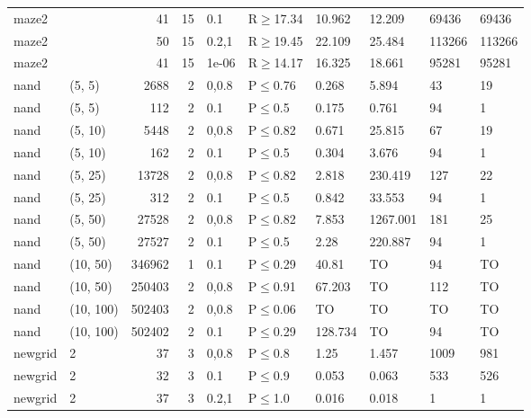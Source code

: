 \begin{longtable}{llrrllllll}
 maze2         &           &     	41 &   15 & 0.1   & R$\geq$17.34 & 10.962  & 12.209   & 69436  & 69436  \\
 maze2         &           &     	50 &   15 & 0.2,1 & R$\geq$19.45 & 22.109  & 25.484   & 113266 & 113266 \\
 maze2         &           &     	41 &   15 & 1e-06 & R$\geq$14.17 & 16.325  & 18.661   & 95281  & 95281  \\
 nand          & (5, 5)    &   	2688 &    2 & 0,0.8 & P$\leq$0.76  & 0.268   & 5.894    & 43     & 19     \\
 nand          & (5, 5)    &    	112 &    2 & 0.1   & P$\leq$0.5   & 0.175   & 0.761    & 94     & 1      \\
 nand          & (5, 10)   &   	5448 &    2 & 0,0.8 & P$\leq$0.82  & 0.671   & 25.815   & 67     & 19     \\
 nand          & (5, 10)   &    	162 &    2 & 0.1   & P$\leq$0.5   & 0.304   & 3.676    & 94     & 1      \\
 nand          & (5, 25)   &  	13728 &    2 & 0,0.8 & P$\leq$0.82  & 2.818   & 230.419  & 127    & 22     \\
 nand          & (5, 25)   &    	312 &    2 & 0.1   & P$\leq$0.5   & 0.842   & 33.553   & 94     & 1      \\
 nand          & (5, 50)   &  	27528 &    2 & 0,0.8 & P$\leq$0.82  & 7.853   & 1267.001 & 181    & 25     \\
 nand          & (5, 50)   &  	27527 &    2 & 0.1   & P$\leq$0.5   & 2.28    & 220.887  & 94     & 1      \\
 nand          & (10, 50)  & 	346962 &    1 & 0.1   & P$\leq$0.29  & 40.81   & TO       & 94     & TO     \\
 nand          & (10, 50)  & 	250403 &    2 & 0,0.8 & P$\leq$0.91  & 67.203  & TO       & 112    & TO     \\
 nand          & (10, 100) & 	502403 &    2 & 0,0.8 & P$\leq$0.06  & TO      & TO       & TO     & TO     \\
 nand          & (10, 100) & 	502402 &    2 & 0.1   & P$\leq$0.29  & 128.734 & TO       & 94     & TO     \\
 newgrid       & 2         &     	37 &    3 & 0,0.8 & P$\leq$0.8   & 1.25    & 1.457    & 1009   & 981    \\
 newgrid       & 2         &     	32 &    3 & 0.1   & P$\leq$0.9   & 0.053   & 0.063    & 533    & 526    \\
 newgrid       & 2         &     	37 &    3 & 0.2,1 & P$\leq$1.0   & 0.016   & 0.018    & 1      & 1      \\

\end{longtable}
